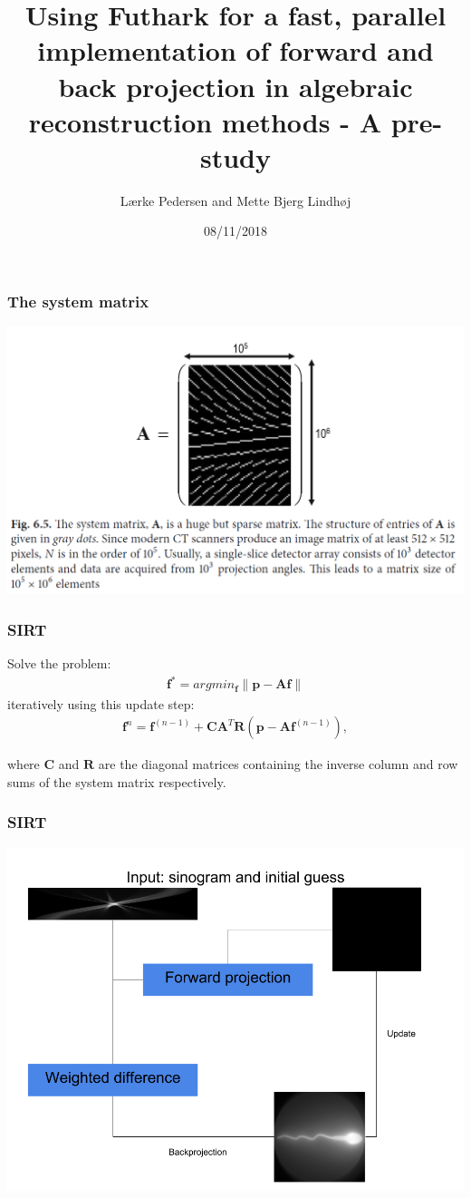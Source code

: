 \documentclass{beamer}
\title[Pre-study]{Using Futhark for a fast, parallel implementation of forward and back projection in algebraic reconstruction methods - A pre-study} %
\author{L\ae rke Pedersen and Mette Bjerg Lindh\o j} %
\institute[DIKU] %
{
University of Copenhagen\\ %
}
\date{08/11/2018} %
\newcommand{\norm}[1]{\left\lVert#1\right\rVert}
\renewcommand{\vec}[1]{\ensuremath{\boldsymbol{#1}}}
\newcommand{\mat}[1]{\ensuremath{\boldsymbol{#1}}}
\newcommand{\inputTikZ}[2]{%
     \scalebox{#1}{}
}
\begin{document}
\begin{frame}
\titlepage %
\end{frame}

 \begin{frame}
  \frametitle{The system matrix}
  \inputTikZ{0.4}{figures/weightings.tex}
 \includegraphics[width=0.4\linewidth,trim={5cm 3cm 5cm 0.5cm},clip]{images/sparsity.png}
 \end{frame}

 \begin{frame}
 \frametitle{SIRT}
 Solve the problem:
 \begin{align}
 \vec{f}^{\ast}=argmin_{\vec{f}}\norm{\vec{p}-\mat{A}\vec{f}}
\end{align}
iteratively using this update step:
 \begin{align}
\vec{f}^{n} = \vec{f}^{(n-1)}+\mat{C}\mat{A}^{T}\mat{R}(\vec{p}-\mat{A}\vec{f}^{(n-1)}),
\end{align}

where $\mat{C}$ and $\mat{R}$ are the diagonal matrices containing the inverse column and row sums of the system matrix respectively.
 \end{frame}

  \begin{frame}
  \frametitle{SIRT}
  \centering
 \includegraphics[width=0.8\linewidth]{images/sirt.png}
 \end{frame}
\end{document}
